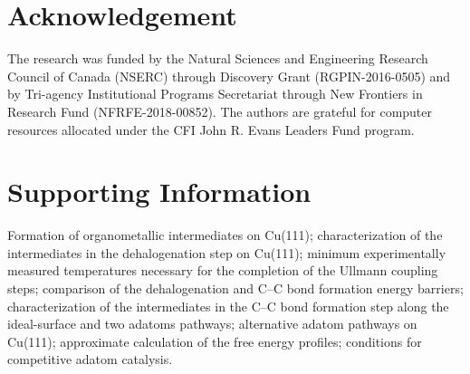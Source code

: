 \documentclass[aps,prb,amsmath,amssymb,11pt]{revtex4-1}
\newcommand*{\ACSNANO}{}
\newcommand{\sinfo}{Supporting Information}
\begin{document}
\ifdefined\ACSNANO



\fi

\section*{Acknowledgement}

The research was funded by the Natural Sciences and Engineering Research Council of Canada (NSERC) through Discovery Grant (RGPIN-2016-0505) and by Tri-agency Institutional Programs Secretariat through New Frontiers in Research Fund (NFRFE-2018-00852). The authors are grateful for computer resources allocated under the CFI John R. Evans Leaders Fund program.

\section*{\sinfo}

Formation of organometallic intermediates on Cu(111); characterization of the intermediates in the dehalogenation step on Cu(111); minimum experimentally measured temperatures necessary for the completion of the Ullmann coupling steps; comparison of the dehalogenation and C--C bond formation energy barriers; characterization of the intermediates in the C--C bond formation step along the ideal-surface and two adatoms pathways; alternative adatom pathways on Cu(111); approximate calculation of the free energy profiles; conditions for competitive adatom catalysis.



%
%
\end{document}
